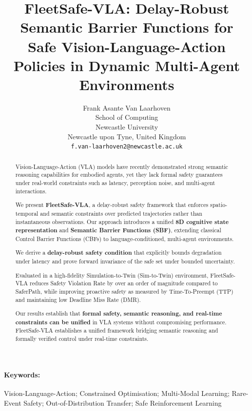 \documentclass[10pt,twocolumn]{article}
\title{FleetSafe-VLA: Delay-Robust Semantic Barrier Functions for Safe Vision-Language-Action Policies in Dynamic Multi-Agent Environments}
\author{
  Frank Asante Van Laarhoven\\
  School of Computing\\
  Newcastle University\\
  Newcastle upon Tyne, United Kingdom\\
  \texttt{f.van-laarhoven2@newcastle.ac.uk}
}
\begin{document}
\maketitle

\begin{abstract}
Vision-Language-Action (VLA) models have recently demonstrated strong semantic reasoning capabilities for embodied agents, yet they lack formal safety guarantees under real-world constraints such as latency, perception noise, and multi-agent interactions.

We present \textbf{FleetSafe-VLA}, a delay-robust safety framework that enforces spatio-temporal and semantic constraints over predicted trajectories rather than instantaneous observations. Our approach introduces a unified \textbf{8D cognitive state representation} and \textbf{Semantic Barrier Functions (SBF)}, extending classical Control Barrier Functions (CBFs) to language-conditioned, multi-agent environments.

We derive a \textbf{delay-robust safety condition} that explicitly bounds degradation under latency and prove forward invariance of the safe set under bounded uncertainty.

Evaluated in a high-fidelity Simulation-to-Twin (Sim-to-Twin) environment, FleetSafe-VLA reduces Safety Violation Rate by over an order of magnitude compared to SaferPath, while improving proactive safety as measured by Time-To-Preempt (TTP) and maintaining low Deadline Miss Rate (DMR).

Our results establish that \textbf{formal safety, semantic reasoning, and real-time constraints can be unified} in VLA systems without compromising performance. FleetSafe-VLA establishes a unified framework bridging semantic reasoning and formally verified control under real-time constraints.
\end{abstract}

\paragraph*{Keywords:}
Vision-Language-Action; Constrained Optimisation; Multi-Modal Learning; Rare-Event Safety; Out-of-Distribution Transfer; Safe Reinforcement Learning

\end{document}

